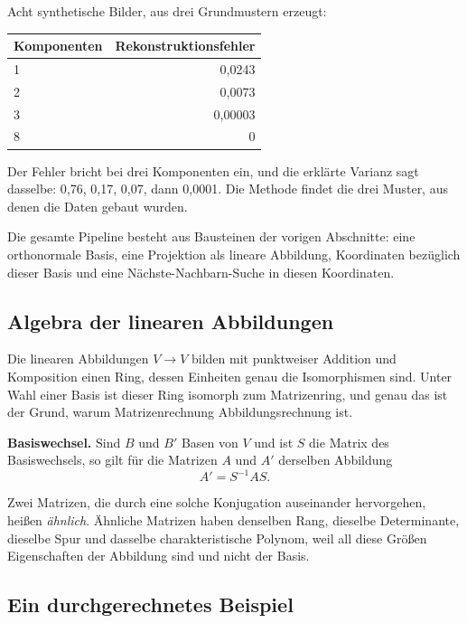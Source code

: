 \documentclass[12pt, a4paper]{article}
\begin{document}
\begin{examplebox}
Acht synthetische Bilder, aus drei Grundmustern erzeugt:

\begin{center}
\begin{tabular}{lr}
\toprule
Komponenten & Rekonstruktionsfehler\\
\midrule
1 & 0{,}0243\\
2 & 0{,}0073\\
3 & 0{,}00003\\
8 & 0\\
\bottomrule
\end{tabular}
\end{center}

Der Fehler bricht bei drei Komponenten ein, und die erklärte Varianz sagt
dasselbe: 0{,}76, 0{,}17, 0{,}07, dann 0{,}0001. Die Methode findet die drei
Muster, aus denen die Daten gebaut wurden.
\end{examplebox}

Die gesamte Pipeline besteht aus Bausteinen der vorigen Abschnitte: eine
orthonormale Basis, eine Projektion als lineare Abbildung, Koordinaten
bezüglich dieser Basis und eine Nächste-Nachbarn-Suche in diesen Koordinaten.

\subsection{Algebra der linearen Abbildungen}

Die linearen Abbildungen $V \to V$ bilden mit punktweiser Addition und
Komposition einen Ring, dessen Einheiten genau die Isomorphismen sind. Unter
Wahl einer Basis ist dieser Ring isomorph zum Matrizenring, und genau das ist
der Grund, warum Matrizenrechnung Abbildungsrechnung ist.

\begin{definitionbox}
\textbf{Basiswechsel.} Sind $B$ und $B'$ Basen von $V$ und ist $S$ die
Matrix des Basiswechsels, so gilt für die Matrizen $A$ und $A'$ derselben
Abbildung
\[
  A' = S^{-1} A S .
\]
\end{definitionbox}

Zwei Matrizen, die durch eine solche Konjugation auseinander hervorgehen,
heißen \emph{ähnlich}. Ähnliche Matrizen haben denselben Rang, dieselbe
Determinante, dieselbe Spur und dasselbe charakteristische Polynom, weil all
diese Größen Eigenschaften der Abbildung sind und nicht der Basis.

\subsection{Ein durchgerechnetes Beispiel}
\end{document}
